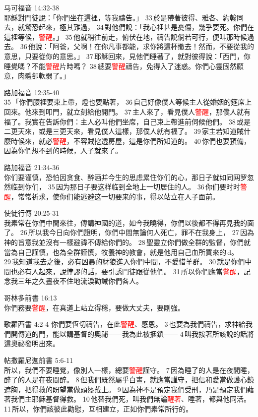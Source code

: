 马可福音 14:32-38\\
耶穌對門徒說：「你們坐在這裡，等我禱告。」 33 於是帶著彼得、雅各、約翰同去，就驚恐起來，極其難過， 34 對他們說：「我心裡甚是憂傷，幾乎要死。你們在這裡等候，\textcolor{red}{警醒}。」 35 他就稍往前走，俯伏在地，禱告說倘若可行，便叫那時候過去。 36 他說：「阿爸，父啊！在你凡事都能，求你將這杯撤去！然而，不要從我的意思，只要從你的意思。」 37 耶穌回來，見他們睡著了，就對彼得說：「西門，你睡覺嗎？不能\textcolor{red}{警醒}片時嗎？ 38 總要\textcolor{red}{警醒}禱告，免得入了迷惑。你們心靈固然願意，肉體卻軟弱了。」

路加福音 12:35-40\\
35 「你們腰裡要束上帶，燈也要點著， 36 自己好像僕人等候主人從婚姻的筵席上回來。他來到叩門，就立刻給他開門。 37 主人來了，看見僕人\textcolor{red}{警醒}，那僕人就有福了。我實在告訴你們：主人必叫他們坐席，自己束上帶進前伺候他們。 38 或是二更天來，或是三更天來，看見僕人這樣，那僕人就有福了。 39 家主若知道賊什麼時候來，就必\textcolor{red}{警醒}，不容賊挖透房屋，這是你們所知道的。 40 你們也要預備，因為你們想不到的時候，人子就來了。

路加福音 21:34-36\\
你们要谨慎，恐怕因贪食、醉酒并今生的思虑累住你们的心，那日子就如同网罗忽然临到你们， 35 因为那日子要这样临到全地上一切居住的人。 36 你们要时时\textcolor{red}{警醒}，常常祈求，使你们能逃避这一切要来的事，得以站立在人子面前。

使徒行傳 20:25-31\\
我素常在你們中間來往，傳講神國的道，如今我曉得，你們以後都不得再見我的面了。 26 所以我今日向你們證明，你們中間無論何人死亡，罪不在我身上， 27 因為神的旨意我並沒有一樣避諱不傳給你們的。 28 聖靈立你們做全群的監督，你們就當為自己謹慎，也為全群謹慎，牧養神的教會，就是他用自己血所買來的 d。 29 我知道我去之後，必有凶暴的豺狼進入你們中間，不愛惜羊群。 30 就是你們中間也必有人起來，說悖謬的話，要引誘門徒跟從他們。 31 所以你們應當\textcolor{red}{警醒}，記念我三年之久晝夜不住地流淚勸誡你們各人。

哥林多前書 16:13\\
你們務要\textcolor{red}{警醒}，在真道上站立得穩，要做大丈夫，要剛強。

歌羅西書 4:2-4
你們要恆切禱告，在此\textcolor{red}{警醒}、感恩。 3 也要為我們禱告，求神給我們開傳道的門，能以講基督的奧祕——我為此被捆鎖—— 4 叫我按著所該說的話將這奧祕發明出來。

帖撒羅尼迦前書 5:6-11\\
所以，我們不要睡覺，像別人一樣，總要\textcolor{red}{警醒}謹守。 7 因為睡了的人是在夜間睡，醉了的人是在夜間醉。 8 但我們既然屬乎白晝，就應當謹守，把信和愛當做護心鏡遮胸，把得救的盼望當做頭盔戴上。 9 因為神不是預定我們受刑，乃是預定我們藉著我們主耶穌基督得救。 10 他替我們死，叫我們無論\textcolor{red}{醒著}、睡著，都與他同活。 11 所以，你們該彼此勸慰，互相建立，正如你們素常所行的。

